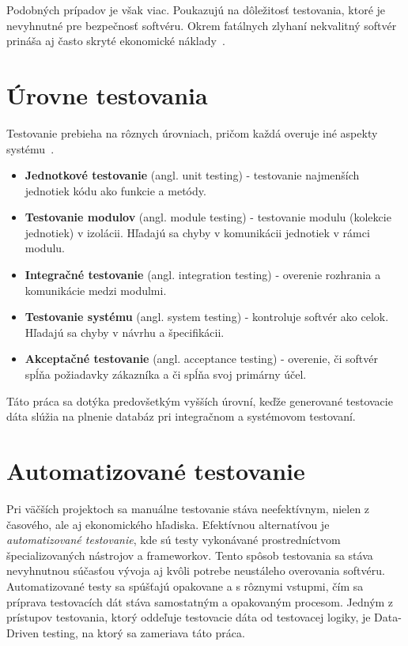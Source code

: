 Podobných prípadov je však viac. Poukazujú na dôležitosť testovania, ktoré je nevyhnutné pre bezpečnosť softvéru. Okrem fatálnych zlyhaní nekvalitný softvér prináša aj často skryté ekonomické náklady~\cite{Krasner2022}.


\section{Úrovne testovania}
\label{sub:urovne_testovania}
Testovanie prebieha na rôznych úrovniach, pričom každá overuje iné aspekty systému~\cite{Ammann2016}.

\begin{itemize}
    \item \textbf{Jednotkové testovanie} (angl. unit testing) - testovanie najmenších jednotiek kódu ako funkcie a metódy.
    \item \textbf{Testovanie modulov} (angl. module testing) - testovanie modulu (kolekcie jednotiek) v izolácii. Hľadajú sa chyby v komunikácii jednotiek v rámci modulu. 
    \item \textbf{Integračné testovanie} (angl. integration testing) - overenie rozhrania a komunikácie medzi modulmi. 
    \item \textbf{Testovanie systému} (angl. system testing) - kontroluje softvér ako celok. Hľadajú sa chyby v návrhu a špecifikácii.
    \item \textbf{Akceptačné testovanie} (angl. acceptance testing) - overenie, či softvér spĺňa požiadavky zákazníka a či spĺňa svoj primárny účel.
\end{itemize}

Táto práca sa dotýka predovšetkým vyšších úrovní, keďže generované testovacie dáta slúžia na plnenie databáz pri integračnom a systémovom testovaní.

\section{Automatizované testovanie}
\label{sub:automatizovanie_testovanie}

Pri väčších projektoch sa manuálne testovanie stáva neefektívnym, nielen z časového, ale aj ekonomického hľadiska. Efektívnou alternatívou je \textit{automatizované testovanie}, kde sú testy vykonávané prostredníctvom špecializovaných nástrojov a frameworkov. Tento spôsob testovania sa stáva nevyhnutnou súčasťou vývoja aj kvôli potrebe neustáleho overovania softvéru. Automatizované testy sa spúšťajú opakovane a s rôznymi vstupmi, čím sa príprava testovacích dát stáva samostatným a opakovaným procesom. Jedným z prístupov testovania, ktorý oddeľuje testovacie dáta od testovacej logiky, je Data-Driven testing, na ktorý sa zameriava táto práca.

